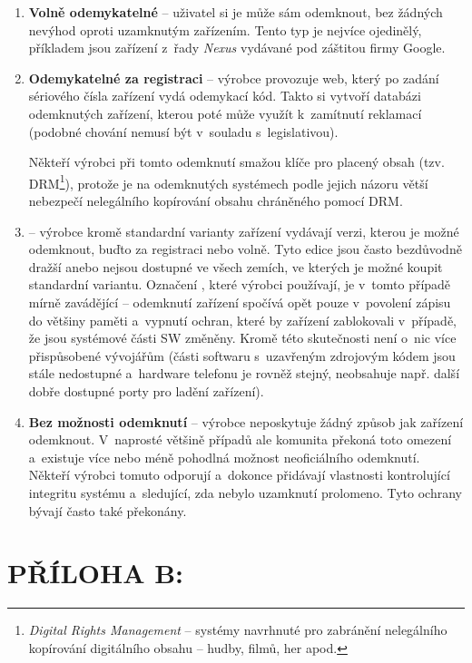 \documentclass[12pt, a4paper, oneside]{article}
\newcommand{\B}{\textbf} %
\newcommand{\It}{\textit}  %
\begin{document}
\begin{enumerate}
    \item \B{Volně odemykatelné} -- uživatel si je může sám odemknout, bez žádných nevýhod oproti uzamknutým zařízením. Tento typ je nejvíce ojedinělý, příkladem jsou zařízení z~řady \It{Nexus} vydávané pod záštitou firmy Google.
    
    \item \B{Odemykatelné za registraci} -- výrobce provozuje web, který po zadání sériového čísla zařízení vydá odemykací kód. Takto si vytvoří databázi odemknutých zařízení, kterou poté může využít k~zamítnutí reklamací (podobné chování nemusí být v~souladu s~legislativou).
    
    Někteří výrobci při tomto odemknutí smažou klíče pro placený obsah (tzv. DRM\footnote{\It{Digital Rights Management} -- systémy navrhnuté pro zabránění nelegálního kopírování digitálního obsahu -- hudby, filmů, her apod.}), protože je na odemknutých systémech podle jejich názoru větší nebezpečí nelegálního kopírování obsahu chráněného pomocí DRM.
    
    \item \B{} -- výrobce kromě standardní varianty zařízení vydávají verzi, kterou je možné odemknout, buďto za registraci nebo volně. Tyto edice jsou často bezdůvodně dražší anebo nejsou dostupné ve všech zemích, ve kterých je možné koupit standardní variantu. Označení , které výrobci používají, je v~tomto případě mírně zavádějící -- odemknutí zařízení spočívá opět pouze v~povolení zápisu do většiny paměti a~vypnutí ochran, které by zařízení zablokovali v~případě, že jsou systémové části SW změněny. Kromě této skutečnosti není o~nic více přispůsobené vývojářům (části softwaru s~uzavřeným zdrojovým kódem jsou stále nedostupné a~hardware telefonu je rovněž stejný, neobsahuje např. další dobře dostupné porty pro ladění zařízení).

    \item \B{Bez možnosti odemknutí} -- výrobce neposkytuje žádný způsob jak zařízení odemknout. V~naprosté většině případů ale komunita překoná toto omezení a~existuje více nebo méně pohodlná možnost neoficiálního odemknutí. Někteří výrobci tomuto odporují a~dokonce přidávají vlastnosti kontrolující integritu systému a~sledující, zda nebylo uzamknutí prolomeno. Tyto ochrany bývají často také překonány.
    
\end{enumerate}

\newpage
\section*{PŘÍLOHA B:}
\end{document}
